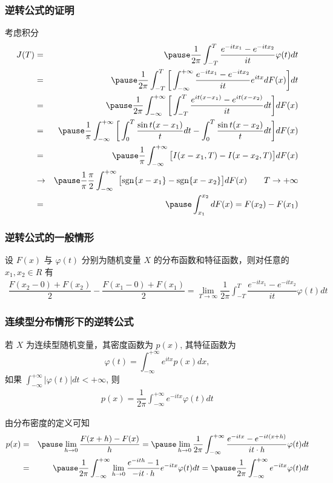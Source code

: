 \begin{frame}
	\frametitle{逆转公式的证明}
	\vspace{-0.2cm}
	\zheng 考虑积分
	\begin{eqnarray*}
		J(T)&=&\pause \dfrac{1}{2\pi}\int_{-T}^T\dfrac{e^{-itx_1}-e^{-itx_2}}{it}\varphi(t)dt\\
		&=&\pause \dfrac{1}{2\pi}\int_{-T}^T\bigg[\int_{-\infty}^{+\infty}\dfrac{e^{-itx_1}-e^{-itx_2}}{it}e^{itx}dF(x)\bigg]dt\\
		&=&\pause \dfrac{1}{2\pi}\int_{-\infty}^{+\infty}\bigg[\int_{-T}^T\dfrac{e^{it(x-x_1)}-e^{it(x-x_2)}}{it}dt\bigg]dF(x)\\
		&=&\pause \dfrac{1}{\pi}\int_{-\infty}^{+\infty}\bigg[\int_0^T\dfrac{\sin t(x-x_1)}{t}dt-\int_0^T\dfrac{\sin t(x-x_2)}{t}dt\bigg]dF(x)\\
		&=&\pause \dfrac{1}{\pi}\int_{-\infty}^{+\infty}\big[I(x-x_1,T)-I(x-x_2,T)\big]dF(x)\\
		&\rightarrow&\pause \dfrac{1}{\pi}\dfrac{\pi}{2}\int_{-\infty}^{+\infty}\big[{\rm sgn}\{x-x_1\}-{\rm sgn}\{x-x_2\}\big]dF(x) \qquad T\rightarrow+\infty\\
		&=&\pause     \int_{x_1}^{x_2}dF(x)=F(x_2)-F(x_1)
	\end{eqnarray*}

\end{frame}
\begin{frame}
	\frametitle{逆转公式的一般情形}
	\begin{thm}[逆转公式一般情形] 设 $F (x)$ 与 $\varphi (t)$ 分别为随机变量 $X$ 的分布函数和特征函数，则对任意的 $x_1,x_2\in R$ 有
		{\small \begin{eqnarray*}
				\dfrac{F(x_2-0)+F(x_2)}{2}-\dfrac{F(x_1-0)+F(x_1)}{2}=\lim_{T\rightarrow\infty}\dfrac{1}{2\pi}\int_{-T}^T\dfrac{e^{-itx_1}-e^{-itx_2}}{it}\varphi(t)dt
		\end{eqnarray*}}
	\end{thm}
\end{frame}
\begin{frame}
	\frametitle{连续型分布情形下的逆转公式}
	\begin{thm}
		若 $X$ 为连续型随机变量，其密度函数为 $p (x)$, 其特征函数为
		\[\varphi(t)=\int_{-\infty}^{+\infty}e^{itx}p(x)dx,\]
		如果 $\int_{-\infty}^{+\infty}|\varphi (t)|dt<+\infty$, 则
		\begin{eqnarray*}
			p(x)=\dfrac{1}{2\pi}\int_{-\infty}^{+\infty}e^{-itx}\varphi(t)dt
		\end{eqnarray*}
	\end{thm}
	\pause \zheng 由分布密度的定义可知
	\begin{eqnarray*}
		p(x)&=&\pause \lim_{h\rightarrow 0}\dfrac{F(x+h)-F(x)}{h}=\pause \lim_{h\rightarrow 0}\dfrac{1}{2\pi}\int_{-\infty}^{+\infty}\dfrac{e^{-itx}-e^{-it(x+h)}}{it\cdot h}\varphi(t)dt\\
		&=&\pause\dfrac{1}{2\pi}\int_{-\infty}^{+\infty} \lim_{h\rightarrow 0}\dfrac{e^{-ith}-1}{-it\cdot h}e^{-itx}\varphi(t)dt=\pause \dfrac{1}{2\pi}\int_{-\infty}^{+\infty}e^{-itx}\varphi(t)dt
	\end{eqnarray*}
\end{frame}

